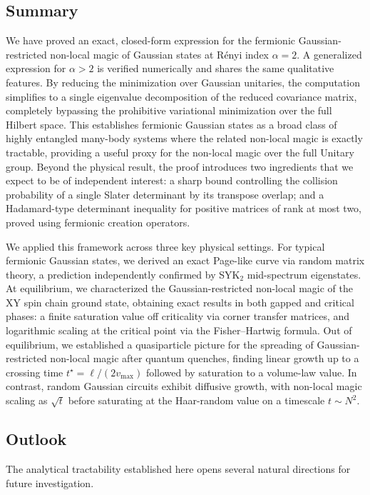 \documentclass[prx,twocolumn,superscriptaddress,aps,10pt, frontmatterverbose, reprint,footinbib,longbibliography=true]{revtex4-2}
\newcommand{\RENYI}{\alpha}
\begin{document}
\subsection{Summary}
We have proved an exact, closed-form expression for the fermionic Gaussian-restricted non-local magic of Gaussian states at R\'enyi index $\RENYI=2$. A generalized expression for $\RENYI>2$ is verified numerically and shares the same qualitative features.
By reducing the minimization over Gaussian unitaries, the computation simplifies to a single eigenvalue decomposition of the reduced covariance matrix, completely bypassing the prohibitive variational minimization over the full Hilbert space. This establishes fermionic Gaussian states as a broad class of highly entangled many-body systems where the related non-local magic is exactly tractable, providing a useful proxy for the non-local magic over the full Unitary group.
Beyond the physical result, the proof introduces two ingredients that we expect to be of independent interest: a sharp bound controlling the collision probability of a single Slater determinant by its transpose overlap; and a Hadamard-type determinant inequality for positive matrices of rank at most two, proved using fermionic creation operators.


We applied this framework across three key physical settings.
For typical fermionic Gaussian states, we derived an exact Page-like curve via random matrix theory, a prediction independently confirmed by SYK$_2$ mid-spectrum eigenstates.
At equilibrium, we characterized the Gaussian-restricted non-local magic of the XY spin chain ground state, obtaining exact results in both gapped and critical phases: a finite saturation value off criticality via corner transfer matrices, and logarithmic scaling at the critical point via the Fisher--Hartwig formula.
Out of equilibrium, we established a quasiparticle picture for the spreading of Gaussian-restricted non-local magic after quantum quenches, finding linear growth up to a crossing time $t^\star= \ell/(2v_\mathrm{max})$  followed by saturation to a volume-law value.
In contrast, random Gaussian circuits exhibit diffusive growth, with non-local magic scaling as $\sqrt{t}$ before saturating at the Haar-random value on a timescale $t\sim N^2$.


\subsection{Outlook}
The analytical tractability established here opens several natural directions for future investigation.
\end{document}
